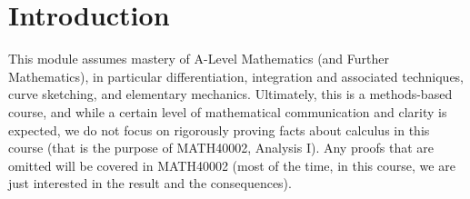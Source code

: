 \documentclass[../calculus.tex]{subfiles}
\begin{document}
\chapter*{Introduction}

This module assumes mastery of A-Level Mathematics (and Further Mathematics), in particular differentiation, integration and associated techniques, curve sketching, and elementary mechanics. 
Ultimately, this is a methods-based course, and while a certain level of mathematical communication and clarity is expected, we do not focus on rigorously proving facts about calculus in this course (that is the purpose of MATH40002, Analysis I). Any proofs that are omitted will be covered in MATH40002 (most of the time, in this course, we are just interested in the result and the consequences).
\end{document}
